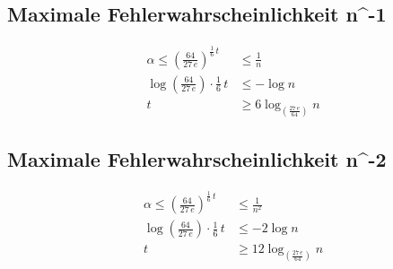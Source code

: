 \subsection{Maximale Fehlerwahrscheinlichkeit n^{-1}}
\label{Maximale Fehlerwahrscheinlichkeit n^{-1}}

\begin{align*}
	\alpha \le \left( \frac{64}{27 \, e} \right)^{\frac{1}{6}\, t} &\le \frac{1}{n} \\
	\log \left(\frac{64}{27 \, e}\right) \cdot \frac{1}{6}\, t &\le - \log{n} \\
	t &\ge 6 \log_{\left(\frac{27 \, e}{64}\right)}{n}
\end{align*}

\subsection{Maximale Fehlerwahrscheinlichkeit n^{-2}}
\label{Maximale Fehlerwahrscheinlichkeit n^{-2}}

\begin{align*}
	\alpha \le \left( \frac{64}{27 \, e} \right)^{\frac{1}{6}\, t} &\le \frac{1}{n^2} \\
	\log \left(\frac{64}{27 \, e}\right) \cdot \frac{1}{6}\, t &\le -2 \log{n} \\
	t &\ge 12 \log_{\left(\frac{27 \, e}{64}\right)}{n}
\end{align*}



